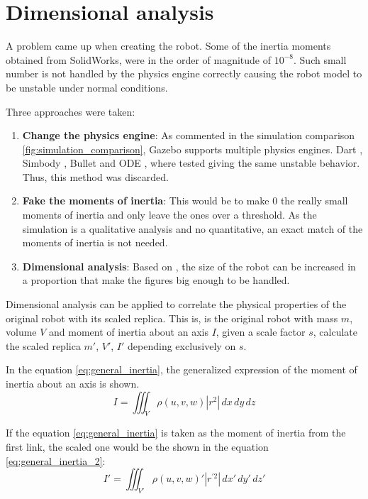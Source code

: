 \section{Dimensional analysis} %
\label{sec:dimensional_analysis}
A problem came up when creating the robot. 
Some of the inertia moments obtained from SolidWorks, were in the order of magnitude of $10^{-8}$.
Such small number is not handled by the physics engine correctly causing the robot model to be unstable under normal conditions.

Three approaches were taken:
\begin{enumerate}
  \item \textbf{Change the physics engine}: As commented in the simulation comparison \ref{fig:simulation_comparison}, Gazebo supports multiple physics engines. Dart \cite{dart}, Simbody \cite{simbody}, Bullet \cite{bullet} and ODE \cite{ode}, where tested giving the same unstable behavior. 
  Thus, this method was discarded.
  \item \textbf{Fake the moments of inertia}: This would be to make 0 the really small moments of inertia and only leave the ones over a threshold.
  As the simulation is a qualitative analysis and no quantitative, an exact match of the moments of inertia is not needed. 
  \item \textbf{Dimensional analysis}: Based on \cite{dimensional_analysis}, the size of the robot can be increased in a proportion that make the figures big enough to be handled.
\end{enumerate}

Dimensional analysis can be applied to correlate the physical properties of the original robot with its scaled replica.
This is, is the original robot with mass $m$, volume $V$ and moment of inertia about an axis $I$, given a scale factor $s$, calculate the scaled replica $m'$, $V'$, $I'$ depending exclusively on $s$.

In the equation \ref{eq:general_inertia}, the generalized expression of the moment of inertia about an axis is shown.
\begin{equation}
\label{eq:general_inertia}
  I = \iiint_V \rho(u,v,w) |r^{2}| \,dx\,dy\,dz
\end{equation}

If the equation \ref{eq:general_inertia} is taken as the moment of inertia from the first link, the scaled one would be the shown in the equation \ref{eq:general_inertia_2}:
\begin{equation}
\label{eq:general_inertia_2}
  I' = \iiint_{V'} \rho(u,v,w)' |r^{'2}| \,dx'\,dy'\,dz'
\end{equation}

